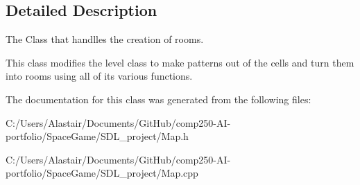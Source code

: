 \subsection{Detailed Description}
The Class that handlles the creation of rooms. 

This class modifies the level class to make patterns out of the cells and turn them into rooms using all of it\textquotesingle{}s various functions. 

The documentation for this class was generated from the following files\+:\begin{DoxyCompactItemize}
\item 
C\+:/\+Users/\+Alastair/\+Documents/\+Git\+Hub/comp250-\/\+A\+I-\/portfolio/\+Space\+Game/\+S\+D\+L\+\_\+project/Map.\+h\item 
C\+:/\+Users/\+Alastair/\+Documents/\+Git\+Hub/comp250-\/\+A\+I-\/portfolio/\+Space\+Game/\+S\+D\+L\+\_\+project/Map.\+cpp\end{DoxyCompactItemize}
